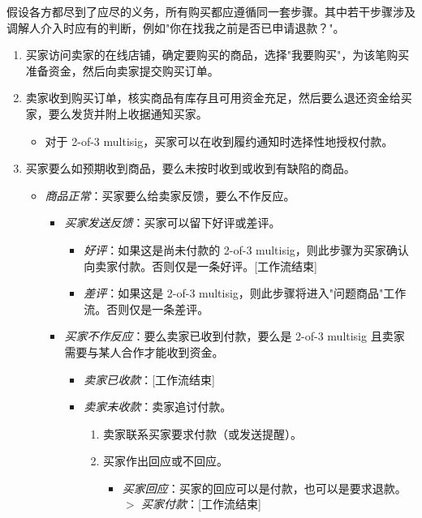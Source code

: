 假设各方都尽到了应尽的义务，所有购买都应遵循同一套步骤。其中若干步骤涉及调解人介入时应有的判断，例如"你在找我之前是否已申请退款？"。
\begin{enumerate}
    \item 买家访问卖家的在线店铺，确定要购买的商品，选择"我要购买"，为该笔购买准备资金，然后向卖家提交购买订单。
    \item 卖家收到购买订单，核实商品有库存且可用资金充足，然后要么退还资金给买家，要么发货并附上收据通知买家。
    \begin{itemize}
        \item 对于 2-of-3 multisig，买家可以在收到履约通知时选择性地授权付款。
    \end{itemize}{}
    \item 买家要么如预期收到商品，要么未按时收到或收到有缺陷的商品。
    \begin{itemize}
        \item {\em 商品正常}：买家要么给卖家反馈，要么不作反应。
        \begin{itemize}
            \item {\em 买家发送反馈}：买家可以留下好评或差评。
            \begin{itemize}
                \item {\em 好评}：如果这是尚未付款的 2-of-3 multisig，则此步骤为买家确认向卖家付款。否则仅是一条好评。[工作流结束]
                \item {\em 差评}：如果这是 2-of-3 multisig，则此步骤将进入"问题商品"工作流。否则仅是一条差评。
            \end{itemize}{}
            \item {\em 买家不作反应}：要么卖家已收到付款，要么是 2-of-3 multisig 且卖家需要与某人合作才能收到资金。
            \begin{itemize}
                \item {\em 卖家已收款}：[工作流结束]
                \item {\em 卖家未收款}：卖家追讨付款。
                \begin{enumerate}
                    \item 卖家联系买家要求付款（或发送提醒）。
                    \item 买家作出回应或不回应。
                    \begin{itemize}
                        \item {\em 买家回应}：买家的回应可以是付款，也可以是要求退款。\\
                        $>$ {\em 买家付款}：[工作流结束]\\

\end{itemize}
\end{enumerate}
\end{itemize}
\end{itemize}
\end{itemize}
\end{enumerate}
